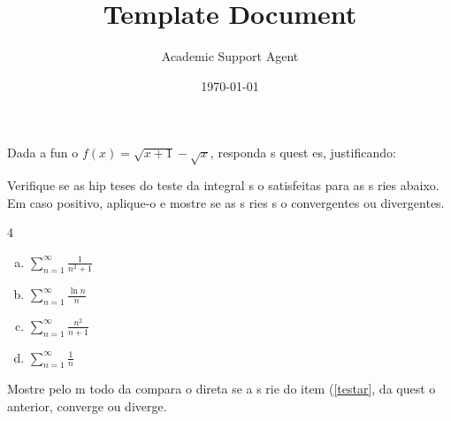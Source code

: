\documentclass{article}
\title{Template Document}
\author{Academic Support Agent}
\date{\today}
\begin{document}
\maketitle

\info\vspace{-1.5 cm} %
\begin{center}
	\gradetable[h]
\end{center}

\begin{questions}%
\question[2] Dada a fun o $f(x)=\sqrt{x+1}-\sqrt{x}$, responda  s quest es, justificando:
\question[2] Verifique se as hip teses do teste da integral s o satisfeitas para as s ries abaixo. Em caso positivo, aplique-o e mostre se as s ries s o convergentes ou divergentes.
\begin{multicols}{4}
\begin{enumerate}[a)]
\item $\sum_{n=1}^\infty \frac{1}{n^2+1}$ 
\item $\sum_{n=1}^\infty \frac{\ln n}{n}$\label{testar}
\item $\sum_{n=1}^\infty \frac{n^2}{n+1}$ 
\item $\sum_{n=1}^\infty \frac{1}{n}$
\end{enumerate}
\end{multicols}
\question[\half] Mostre pelo m todo da compara o direta se a s rie do item (\ref{testar}, da quest o anterior, converge ou diverge.


\end{questions}
\end{document}

